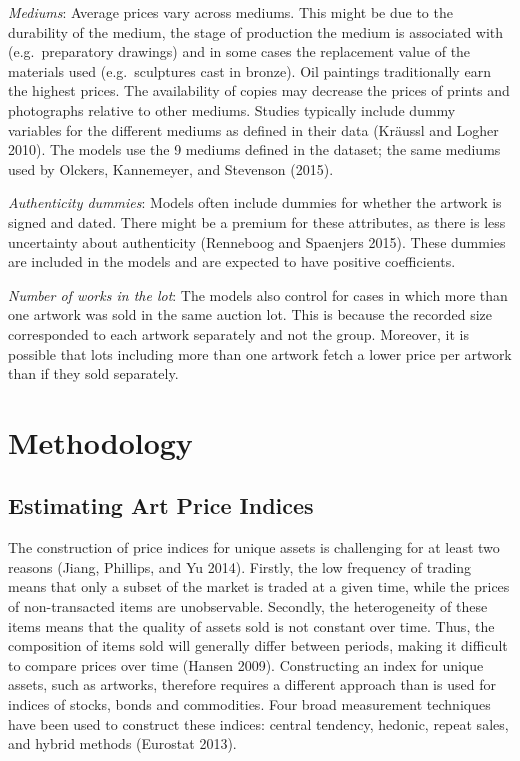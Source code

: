 \documentclass[]{elsarticle} %
\begin{document}
\emph{Mediums}: Average prices vary across mediums. This might be due to
the durability of the medium, the stage of production the medium is
associated with (e.g.~preparatory drawings) and in some cases the
replacement value of the materials used (e.g.~sculptures cast in
bronze). Oil paintings traditionally earn the highest prices. The
availability of copies may decrease the prices of prints and photographs
relative to other mediums. Studies typically include dummy variables for
the different mediums as defined in their data (Kräussl and Logher
2010). The models use the 9 mediums defined in the dataset; the same
mediums used by Olckers, Kannemeyer, and Stevenson (2015).

\emph{Authenticity dummies}: Models often include dummies for whether
the artwork is signed and dated. There might be a premium for these
attributes, as there is less uncertainty about authenticity (Renneboog
and Spaenjers 2015). These dummies are included in the models and are
expected to have positive coefficients.

\emph{Number of works in the lot}: The models also control for cases in
which more than one artwork was sold in the same auction lot. This is
because the recorded size corresponded to each artwork separately and
not the group. Moreover, it is possible that lots including more than
one artwork fetch a lower price per artwork than if they sold
separately.

\section{Methodology}\label{methodology}

\subsection{Estimating Art Price
Indices}\label{estimating-art-price-indices}

The construction of price indices for unique assets is challenging for
at least two reasons (Jiang, Phillips, and Yu 2014). Firstly, the low
frequency of trading means that only a subset of the market is traded at
a given time, while the prices of non-transacted items are unobservable.
Secondly, the heterogeneity of these items means that the quality of
assets sold is not constant over time. Thus, the composition of items
sold will generally differ between periods, making it difficult to
compare prices over time (Hansen 2009). Constructing an index for unique
assets, such as artworks, therefore requires a different approach than
is used for indices of stocks, bonds and commodities. Four broad
measurement techniques have been used to construct these indices:
central tendency, hedonic, repeat sales, and hybrid methods (Eurostat
2013).
\end{document}
